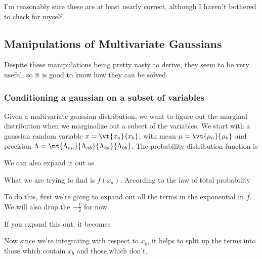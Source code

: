 \documentclass[12pt]{article}
\begin{document}
I'm reasonably sure these are at least nearly correct, although I haven't bothered to check for myself.

\subsection{Manipulations of Multivariate Gaussians}

Despite these manipulations being pretty nasty to derive, they seem to be very useful, so it is good to know how they can be solved. 

\subsubsection{Conditioning a gaussian on a subset of variables}

Given a multivariate gaussian distribution, we want to figure out the marginal distribution when we marginalize out a subset of the variables. We start with a gaussian random variable $x = \vt{x_a}{x_b}$, with mean $\mu = \vt{\mu_a}{\mu_b}$ and precision $\Lambda = \mt{\Lambda_{aa}}{\Lambda_{ab}}{\Lambda_{ba}}{\Lambda_{bb}}$. The probability distribution function is


We can also expand it out as


What we are trying to find is $f(x_a)$. According to the law of total probability


To do this, first we're going to expand out all the terms in the exponential in $f$. We will also drop the $-\frac{1}{2}$ for now.


If you expand this out, it becomes


Now since we're integrating with respect to $x_b$, it helps to split up the terms into those which contain $x_b$ and those which don't.
\end{document}
